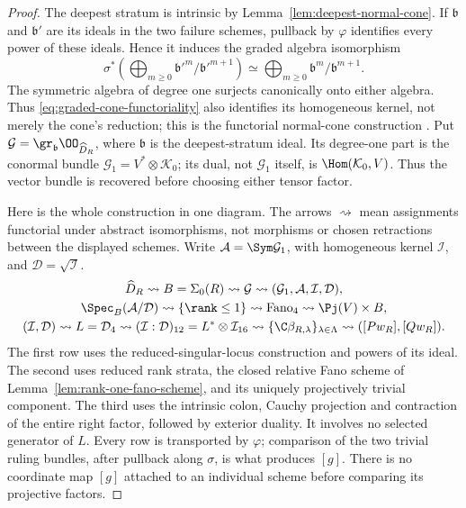 \begin{proof}
The deepest stratum is intrinsic by
Lemma~\ref{lem:deepest-normal-cone}.  If \(\mathfrak b\) and
\(\mathfrak b'\) are its ideals in the two failure schemes, pullback
by \(\varphi\) identifies every power of these ideals.  Hence it
induces the graded algebra isomorphism
\begin{equation}\label{eq:graded-cone-functoriality}
 \sigma^*\!\left(\bigoplus_{m\ge0}
                  \mathfrak b'^m/\mathfrak b'^{m+1}\right)
       \simeq \bigoplus_{m\ge0}\mathfrak b^m/\mathfrak b^{m+1}.
\end{equation}
The symmetric algebra of degree one surjects canonically onto either
algebra.  Thus \eqref{eq:graded-cone-functoriality} also identifies
its homogeneous kernel, not merely the cone's reduction; this is the
functorial normal-cone construction \cite{StacksNormalCone}.
Put \(\mathcal G=\gr_{\mathfrak b}\OO_{\widehat D_R}\),
where \(\mathfrak b\) is the deepest-stratum ideal.  Its degree-one
part is the conormal bundle \(\mathcal G_1=V^*\otimes\mathcal K_0\);
its dual, not \(\mathcal G_1\) itself, is
\(\Hom(\mathcal K_0,V)\).  Thus the vector bundle is recovered
before choosing either tensor factor.

Here is the whole construction in one diagram.  The arrows
\(\rightsquigarrow\) mean assignments functorial under abstract
isomorphisms, not morphisms or chosen retractions between the displayed
schemes.  Write \(\mathcal A=\Sym\mathcal G_1\), with homogeneous
kernel \(\mathcal I\), and \(\mathcal D=\sqrt{\mathcal I}\).
\begin{equation}\label{eq:full-intrinsic-chain}
\begin{gathered}
 \widehat D_R\rightsquigarrow B=\Sigma_0(R)
 \rightsquigarrow\mathcal G\rightsquigarrow
           (\mathcal G_1,\mathcal A,\mathcal I,\mathcal D),\\
 \Spec_B(\mathcal A/\mathcal D)
 \rightsquigarrow\{\rank\le1\}
 \rightsquigarrow\operatorname{Fano}_{4}
 \rightsquigarrow\Pj(V)\times B,\\
 (\mathcal I,\mathcal D)\rightsquigarrow
 L=\mathcal D_4\rightsquigarrow
 (\mathcal I:\mathcal D)_{12}=L^*\otimes\mathcal I_{16}
 \rightsquigarrow\{\C\beta_{R,\lambda}\}_{\lambda\in\Lambda}
 \rightsquigarrow([Pw_R],[Qw_R]).
\end{gathered}
\end{equation}
The first row uses the reduced-singular-locus construction and powers
of its ideal.  The second uses reduced rank strata, the closed relative
Fano scheme of Lemma~\ref{lem:rank-one-fano-scheme}, and its uniquely
projectively trivial component.  The third uses the intrinsic colon,
Cauchy projection and contraction of the entire right factor, followed
by exterior duality.  It involves no selected generator of \(L\).
Every row is transported by \(\varphi\); comparison of the two
trivial ruling bundles, after pullback along \(\sigma\), is what
produces \([g]\).  There is no coordinate map \([g]\) attached
to an individual scheme before comparing its projective factors.


\end{proof}
